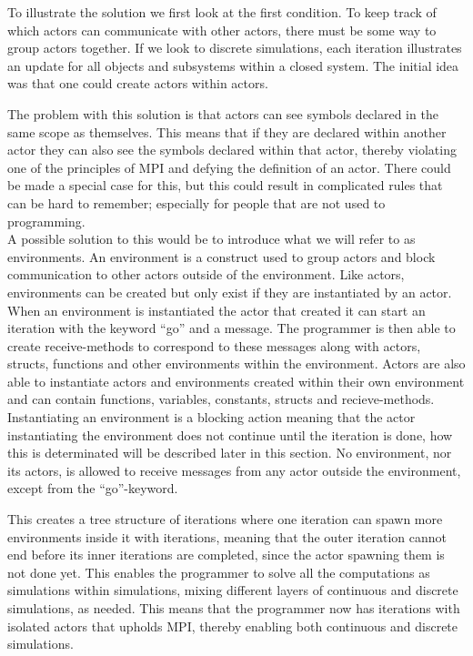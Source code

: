 To illustrate the solution we first look at the first condition.
To keep track of which actors can communicate with other actors, there must be some way to group actors together. If we look to discrete simulations, each iteration illustrates an update for all objects and subsystems within a closed system. The initial idea was that one could create actors within actors. 

The problem with this solution is that actors can see symbols declared in the same scope as themselves. This means that if they are declared within another actor they can also see the symbols declared within that actor, thereby violating one of the principles of MPI and defying the definition of an actor. There could be made a special case for this, but this could result in complicated rules that can be hard to remember; especially for people that are not used to programming.\\

A possible solution to this would be to introduce what we will refer to as environments. An environment is a construct used to group actors and block communication to other actors outside of the environment. Like actors, environments can be created but only exist if they are instantiated by an actor. When an environment is instantiated the actor that created it can start an iteration with the keyword \enquote{go} and a message. The programmer is then able to create receive-methods to correspond to these messages along with actors, structs, functions and other environments within the environment. Actors are also able to instantiate actors and environments created within their own environment and can contain functions, variables, constants, structs and recieve-methods.\\

Instantiating an environment is a blocking action meaning that the actor instantiating the environment does not continue until the iteration is done, how this is determinated will be described later in this section. No environment, nor its actors, is allowed to receive messages from any actor outside the environment, except from the \enquote{go}-keyword. 

This creates a tree structure of iterations where one iteration can spawn more environments inside it with iterations, meaning that the outer iteration cannot end before its inner iterations are completed, since the actor spawning them is not done yet. This enables the programmer to solve all the computations as simulations within simulations, mixing different layers of continuous and discrete simulations, as needed. This means that the programmer now has iterations with isolated actors that upholds MPI, thereby enabling both continuous and discrete simulations.\\

